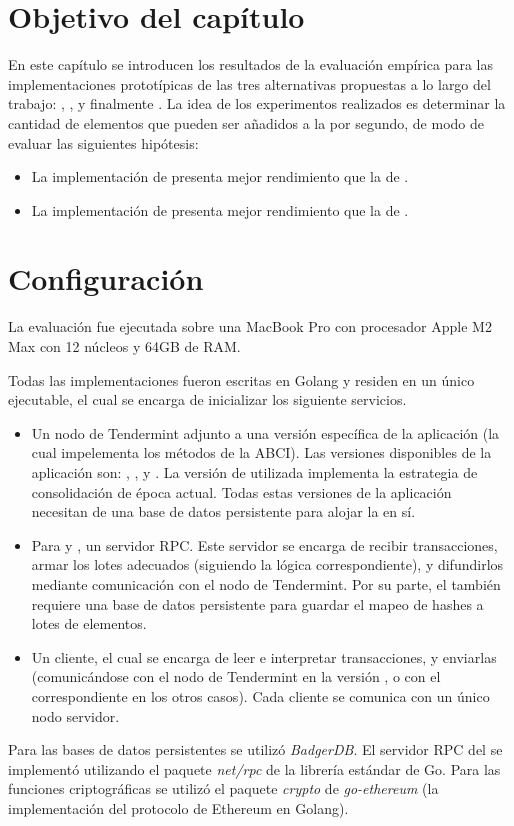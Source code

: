 \section{Objetivo del capítulo}\label{sec:benchmark}
En este capítulo se introducen los resultados de la evaluación empírica para las implementaciones
prototípicas de las tres alternativas propuestas a lo largo del trabajo: \vanilla, \compresschain,
y finalmente \hashchain.
La idea de los experimentos realizados es determinar la cantidad de elementos que pueden ser
añadidos a la \setchain por segundo, de modo de evaluar las siguientes hipótesis:
\begin{itemize}
	\item La implementación de \compresschain presenta mejor rendimiento que la de \vanilla.
	\item La implementación de \hashchain presenta mejor rendimiento que la de \compresschain.
\end{itemize}

\section{Configuración}
%
La evaluación fue ejecutada sobre una MacBook Pro con procesador Apple M2 Max
con 12 núcleos y 64GB de RAM.

%
Todas las implementaciones fueron escritas en Golang y residen en un único ejecutable, el cual se encarga
de inicializar los siguiente servicios.
\begin{itemize}
	\item Un nodo de Tendermint adjunto a una versión específica de la aplicación (la cual impelementa los métodos
	de la ABCI). Las versiones disponibles de la aplicación son: \vanilla, \compresschain, y \hashchain.
	La versión de \hashchain utilizada implementa la estrategia de consolidación de época actual.
	Todas estas versiones de la 
	aplicación necesitan de una base de datos persistente para alojar la \setchain en sí.
	\item Para \compresschain y \hashchain, un servidor \collector RPC. Este servidor se encarga de recibir transacciones,
	armar los lotes adecuados (siguiendo la lógica correspondiente), y difundirlos mediante comunicación con el nodo
	de Tendermint. Por su parte, el \hcollector también requiere una base de datos persistente para guardar el mapeo de
	hashes a lotes de elementos.
	\item Un cliente, el cual se encarga de leer e interpretar transacciones, y enviarlas (comunicándose con el nodo de
	Tendermint en la versión \vanilla, o con el \collector correspondiente en los otros casos). Cada cliente se comunica
	con un único nodo servidor.
\end{itemize}
Para las bases de datos persistentes se utilizó \textit{BadgerDB}\cite{db.badger}.
El servidor RPC del \collector se implementó utilizando el paquete \textit{net/rpc} de la librería estándar de Go.
Para las funciones criptográficas se utilizó el paquete \textit{crypto} de \textit{go-ethereum} (la implementación
del protocolo de Ethereum en Golang). 

